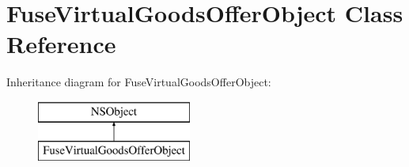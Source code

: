 \hypertarget{interface_fuse_virtual_goods_offer_object}{}\section{Fuse\+Virtual\+Goods\+Offer\+Object Class Reference}
\label{interface_fuse_virtual_goods_offer_object}
Inheritance diagram for Fuse\+Virtual\+Goods\+Offer\+Object\+:\begin{figure}[H]
\begin{center}
\leavevmode
\includegraphics[height=2.000000cm]{interface_fuse_virtual_goods_offer_object}
\end{center}
\end{figure}
